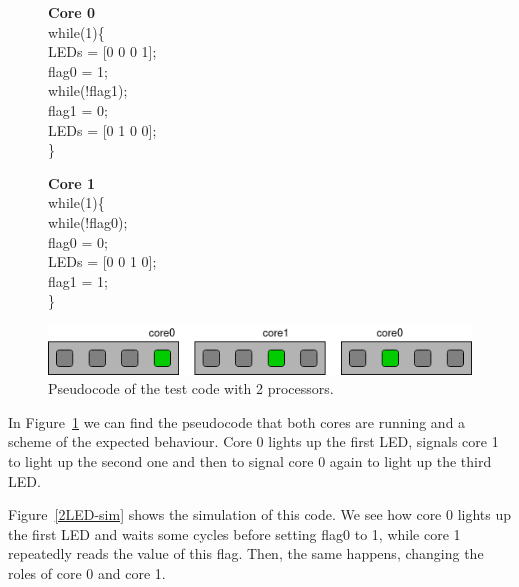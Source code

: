 \begin{figure}[htbp]
\centering
\begin{minipage}[t][4cm][t]{4.5cm}
\textbf{Core 0}\\
while(1)\{\\
\hspace*{1cm}LEDs = [0 0 0 1];\\
\hspace*{1cm}flag0 = 1;\\
\hspace*{1cm}while(!flag1);\\
\hspace*{1cm}flag1 = 0;\\
\hspace*{1cm}LEDs = [0 1 0 0];\\
\}
\end{minipage}\hspace{2.5cm}
\begin{minipage}[t][4cm][t]{4.5cm}
\textbf{Core 1}\\
while(1)\{\\
\hspace*{1cm}while(!flag0);\\
\hspace*{1cm}flag0 = 0;\\
\hspace*{1cm}LEDs = [0 0 1 0];\\
\hspace*{1cm}flag1 = 1;\\
\}
\end{minipage}%
\vspace{.1cm}
\includegraphics[width=.75\textwidth]{images/leds2_fig.png}
\caption{Pseudocode of the test code with 2 processors.}
\label{2LED-code}
\end{figure}
\clearpage
In Figure~\ref{2LED-code} we can find the pseudocode that both cores are running and a scheme of the expected behaviour.
Core 0 lights up the first LED, signals core 1 to light up the second one and then to signal core 0 again to light up the third LED.

Figure~\ref{2LED-sim} shows the simulation of this code.
We see how core 0 lights up the first LED and waits some cycles before setting flag0 to 1, while core 1 repeatedly reads the value of this flag.
Then, the same happens, changing the roles of core 0 and core 1.

